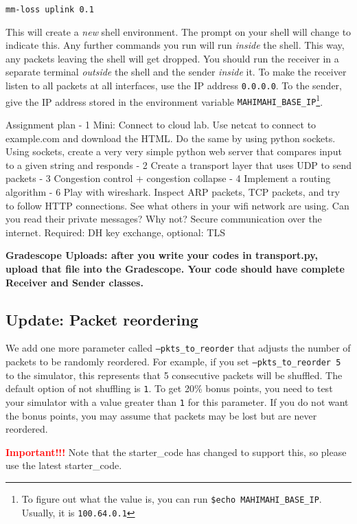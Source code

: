 \documentclass{article}
\begin{document}
\begin{verbatim}
mm-loss uplink 0.1
\end{verbatim}

This will create a \emph{new} shell environment. The prompt on your shell will change to indicate this. Any further commands you run will run \emph{inside} the shell. This way, any packets leaving the shell will get dropped. You should run the receiver in a separate terminal \emph{outside} the shell and the sender \emph{inside} it. To make the receiver listen to all packets at all interfaces, use the IP address {\tt 0.0.0.0}. To the sender, give the IP address stored in the environment variable {\tt MAHIMAHI\_BASE\_IP}\footnote{To figure out what the value is, you can run {\tt \$echo MAHIMAHI\_BASE\_IP}. Usually, it is {\tt 100.64.0.1}}.

  Assignment plan
  - 1 Mini: Connect to cloud lab. Use netcat to connect to example.com and download the HTML. Do the same by using python sockets. Using sockets, create a very very simple python web server that compares input to a given string and responds
  - 2 Create a transport layer that uses UDP to send packets
  - 3 Congestion control + congestion collapse
  - 4 Implement a routing algorithm
  - 6 Play with wireshark. Inspect ARP packets, TCP packets, and try to follow HTTP connections. See what others in your wifi network are using. Can you read their private messages? Why not? Secure communication over the internet. Required: DH key exchange, optional: TLS
\fi

\noindent\textbf{Gradescope Uploads: after you write your codes in transport.py, upload that file into the Gradescope. Your code should have complete Receiver and Sender classes.}

\subsection{Update: Packet reordering}

We add one more parameter called {\tt --pkts\_to\_reorder} that adjusts the number of packets to be randomly reordered. For example, if you set {\tt --pkts\_to\_reorder 5} to the simulator, this represents that 5 consecutive packets will be shuffled. The default option of not shuffling is {\tt 1}. To get 20\% bonus points, you need to test your simulator with a value greater than {\tt 1} for this parameter. If you do not want the bonus points, you may assume that packets may be lost but are never reordered.

\textbf{\textcolor{red}{Important!!!}} Note that the {starter\_code} has changed to support this, so please use the latest {starter\_code}.
\end{document}
